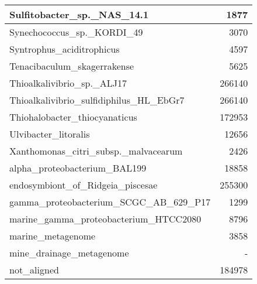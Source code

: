 \documentclass[12pt,a4paper]{article}
\begin{document}
\begin{table}[ht]
\begin{center}
\begin{tabular}{|l*{1}{|r}|}
Sulfitobacter\_sp.\_NAS\_14.1 & 1877 \\ \hline
Synechococcus\_sp.\_KORDI\_49 & 3070 \\ \hline
Syntrophus\_aciditrophicus & 4597 \\ \hline
Tenacibaculum\_skagerrakense & 5625 \\ \hline
Thioalkalivibrio\_sp.\_ALJ17 & 266140 \\ \hline
Thioalkalivibrio\_sulfidiphilus\_HL\_EbGr7 & 266140 \\ \hline
Thiohalobacter\_thiocyanaticus & 172953 \\ \hline
Ulvibacter\_litoralis & 12656 \\ \hline
Xanthomonas\_citri\_subsp.\_malvacearum & 2426 \\ \hline
alpha\_proteobacterium\_BAL199 & 18858 \\ \hline
endosymbiont\_of\_Ridgeia\_piscesae & 255300 \\ \hline
gamma\_proteobacterium\_SCGC\_AB\_629\_P17 & 1299 \\ \hline
marine\_gamma\_proteobacterium\_HTCC2080 & 8796 \\ \hline
marine\_metagenome & 3858 \\ \hline
mine\_drainage\_metagenome & - \\ \hline
not\_aligned & 184978 \\ \hline
\end{tabular}
\end{center}
\end{table}
\end{document}
